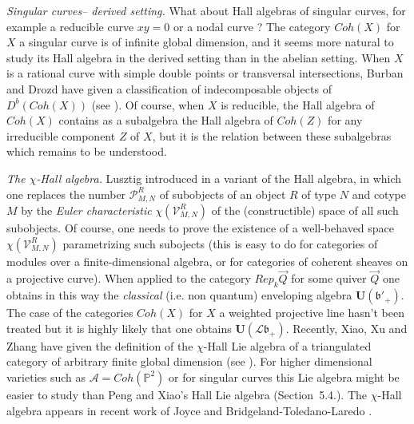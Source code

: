 \documentclass[a4paper,10pt]{amsart}
\def\U{\mathbf{U}}
\def\A{\mathcal{A}}
\def\bo{\mathfrak{b}}
\numberwithin{equation}{section}
\begin{document}
{\vspace{.2in}

\noindent
\textit{Singular curves-- derived setting.} What about Hall algebras of singular curves, for example a reducible curve $xy=0$ or a nodal curve ? The category $Coh(X)$ for $X$ a singular curve is of infinite global dimension, and it seems more natural to study its Hall algebra in the derived setting than in the abelian setting. When $X$ is a rational curve with simple double points or transversal intersections, Burban and Drozd have given a classification of indecomposable objects of $D^b(Coh(X))$ (see \cite{BD}). Of course, when $X$ is reducible, the Hall algebra of $Coh(X)$ contains as a subalgebra the Hall algebra of $Coh(Z)$ for any irreducible component $Z$ of $X$, but it is the relation between these subalgebras which remains to be understood.

\vspace{.2in}

\noindent
\textit{The $\chi$-Hall algebra.} Lusztig introduced in \cite{Luseuler} a variant of the Hall algebra, in which one replaces the {number} $\mathcal{P}_{M,N}^R$ of subobjects of an object $R$ of type $N$ and cotype $M$ by the \textit{Euler characteristic} $\chi(\mathcal{V}_{M,N}^R)$ of the (constructible) space of all such subobjects. Of course, one needs to prove the existence of a well-behaved space $\chi(\mathcal{V}_{M,N}^R)$ parametrizing such subojects (this is easy to do for categories of modules over a finite-dimensional algebra, or for categories of coherent sheaves on a projective curve). When applied to the category $Rep_k\vec{Q}$ for some quiver $\vec{Q}$ one obtains in this way the \textit{classical} (i.e. non quantum) enveloping algebra $\U(\bo'_+)$. The case of the categories $Coh(X)$ for $X$ a weighted projective line hasn't been treated but it is highly likely that one obtains $\U(\mathcal{L}\bo_+)$. Recently, Xiao, Xu and Zhang have given the definition of the $\chi$-Hall Lie algebra of a triangulated category of arbitrary finite global dimension (see \cite{XXZ}). For higher dimensional varieties such as $\A=Coh(\mathbb{P}^2)$ or for singular curves this Lie algebra might be easier to study than Peng and Xiao's Hall Lie algebra (Section~5.4.). The $\chi$-Hall algebra appears in recent work of Joyce \cite{Joyce} and Bridgeland-Toledano-Laredo \cite{BTL}.

\vspace{.2in}

}
\end{document}
